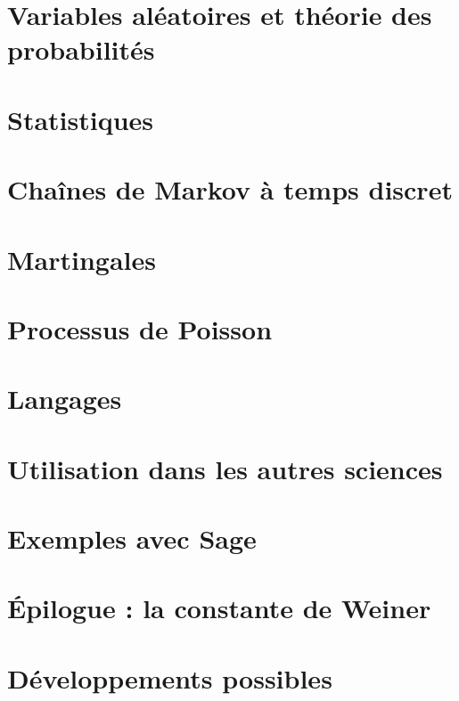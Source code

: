 \documentclass[french,a4paper]{book}
\begin{document}
\chapter{Variables aléatoires et théorie des probabilités}





\chapter{Statistiques}


\chapter{Chaînes de Markov à temps discret}


\chapter{Martingales}


\chapter{Processus de Poisson}


\chapter{Langages}


\chapter{Utilisation dans les autres sciences}


\chapter{Exemples avec Sage}



\chapter{Épilogue : la constante de Weiner}



\chapter{Développements possibles}

\end{document}
